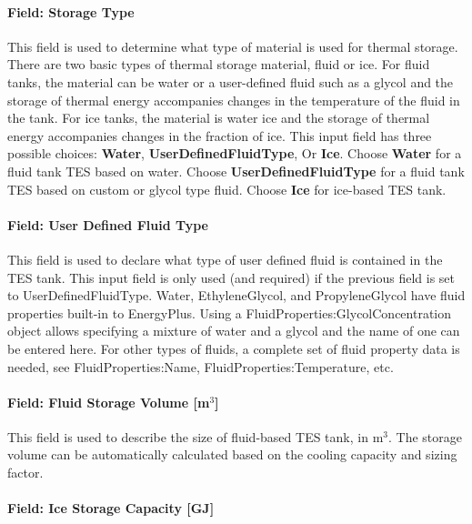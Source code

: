 \paragraph{Field: Storage Type}\label{field-storage-type}

This field is used to determine what type of material is used for thermal storage. There are two basic types of thermal storage material, fluid or ice. For fluid tanks, the material can be water or a user-defined fluid such as a glycol and the storage of thermal energy accompanies changes in the temperature of the fluid in the tank. For ice tanks, the material is water ice and the storage of thermal energy accompanies changes in the fraction of ice. This input field has three possible choices: \textbf{Water}, \textbf{UserDefinedFluidType}, Or \textbf{Ice}. Choose \textbf{Water} for a fluid tank TES based on water. Choose \textbf{UserDefinedFluidType} for a fluid tank TES based on custom or glycol type fluid. Choose \textbf{Ice} for ice-based TES tank.

\paragraph{Field: User Defined Fluid Type}\label{field-user-defined-fluid-type}

This field is used to declare what type of user defined fluid is contained in the TES tank. This input field is only used (and required) if the previous field is set to UserDefinedFluidType. Water, EthyleneGlycol, and PropyleneGlycol have fluid properties built-in to EnergyPlus. Using a FluidProperties:GlycolConcentration object allows specifying a mixture of water and a glycol and the name of one can be entered here. For other types of fluids, a complete set of fluid property data is needed, see FluidProperties:Name, FluidProperties:Temperature, etc.

\paragraph{Field: Fluid Storage Volume {[}m\(^{3}\){]}}\label{field-fluid-storage-volume-m3}

This field is used to describe the size of fluid-based TES tank, in m\(^{3}\). The storage volume can be automatically calculated based on the cooling capacity and sizing factor.

\paragraph{Field: Ice Storage Capacity {[}GJ{]}}\label{field-ice-storage-capacity-gj}

